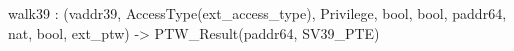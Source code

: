 walk39 : (vaddr39, AccessType(ext_access_type), Privilege, bool, bool, paddr64, nat, bool, ext_ptw) -> PTW_Result(paddr64, SV39_PTE)
